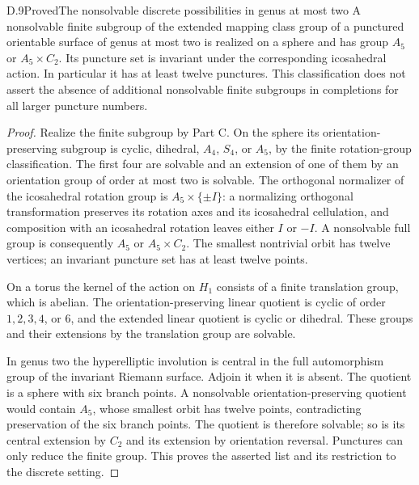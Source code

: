 \begin{claim}{D.9}{Proved}{The nonsolvable discrete possibilities in genus at most two}
A nonsolvable finite subgroup of the extended mapping class group of a punctured orientable surface of genus at most two is realized on a sphere and has group $A_5$ or $A_5\times C_2$. Its puncture set is invariant under the corresponding icosahedral action. In particular it has at least twelve punctures. This classification does not assert the absence of additional nonsolvable finite subgroups in completions for all larger puncture numbers.
\end{claim}
\begin{proof}
Realize the finite subgroup by Part C. On the sphere its orientation-preserving subgroup is cyclic, dihedral, $A_4$, $S_4$, or $A_5$, by the finite rotation-group classification. The first four are solvable and an extension of one of them by an orientation group of order at most two is solvable. The orthogonal normalizer of the icosahedral rotation group is $A_5\times\{\pm I\}$: a normalizing orthogonal transformation preserves its rotation axes and its icosahedral cellulation, and composition with an icosahedral rotation leaves either $I$ or $-I$. A nonsolvable full group is consequently $A_5$ or $A_5\times C_2$. The smallest nontrivial orbit has twelve vertices; an invariant puncture set has at least twelve points.

On a torus the kernel of the action on $H_1$ consists of a finite translation group, which is abelian. The orientation-preserving linear quotient is cyclic of order $1,2,3,4$, or $6$, and the extended linear quotient is cyclic or dihedral. These groups and their extensions by the translation group are solvable.

In genus two the hyperelliptic involution is central in the full automorphism group of the invariant Riemann surface. Adjoin it when it is absent. The quotient is a sphere with six branch points. A nonsolvable orientation-preserving quotient would contain $A_5$, whose smallest orbit has twelve points, contradicting preservation of the six branch points. The quotient is therefore solvable; so is its central extension by $C_2$ and its extension by orientation reversal. Punctures can only reduce the finite group. This proves the asserted list and its restriction to the discrete setting.
\end{proof}

